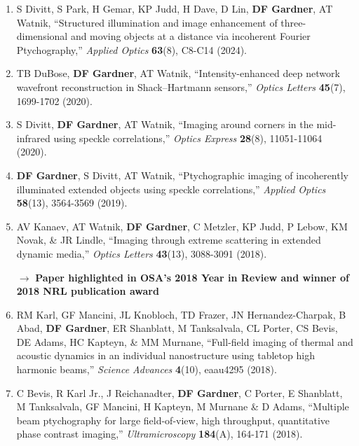 \documentclass[letterpaper,12pt]{article}
\begin{document}
\begin{enumerate}[leftmargin=*]
	
	\item S Divitt, S Park, H Gemar, KP Judd, H Dave, D Lin, \textbf{DF Gardner}, AT Watnik, ``Structured illumination and image enhancement of three-dimensional and moving objects at a distance via incoherent Fourier Ptychography,'' \emph{Applied Optics} \textbf{63}(8), C8-C14 (2024).
	
	\item TB DuBose, \textbf{DF Gardner}, AT Watnik, ``Intensity-enhanced deep network wavefront reconstruction in Shack–Hartmann sensors,'' \emph{Optics Letters} \textbf{45}(7), 1699-1702 (2020).

	\item S Divitt, \textbf{DF Gardner}, AT Watnik, ``Imaging around corners in the mid-infrared using speckle correlations,'' \emph{Optics Express} \textbf{28}(8), 11051-11064 (2020).

	\item \textbf{DF Gardner}, S Divitt, AT Watnik, ``Ptychographic imaging of incoherently illuminated extended objects using speckle correlations,'' \emph{Applied Optics} \textbf{58}(13), 3564-3569 (2019).
	
	\item AV Kanaev, AT Watnik, \textbf{DF Gardner}, C Metzler, KP Judd, P Lebow, KM Novak, \& JR Lindle, ``Imaging through extreme scattering in extended dynamic media,''  \emph{Optics Letters} \textbf{43}(13), 3088-3091 (2018).
	
	\quad $\rightarrow$ \textbf{Paper highlighted in OSA's 2018 Year in Review and winner of 2018 NRL publication award}
	
	\item RM Karl, GF Mancini, JL Knobloch, TD Frazer, JN Hernandez-Charpak, B Abad, \textbf{DF Gardner}, ER Shanblatt, M Tanksalvala, CL Porter, CS Bevis, DE Adams, HC Kapteyn, \& MM Murnane, ``Full-field imaging of thermal and acoustic dynamics in an individual nanostructure using tabletop high harmonic beams,'' \emph{Science Advances} \textbf{4}(10), eaau4295 (2018).
	
	\item  C Bevis, R Karl Jr., J Reichanadter, \textbf{DF Gardner}, C Porter, E Shanblatt, M Tanksalvala, GF Mancini, H Kapteyn, M Murnane \& D Adams, ``Multiple beam ptychography for large field-of-view, high throughput, quantitative phase contrast imaging,''  \emph{Ultramicroscopy} \textbf{184}(A), 164-171 (2018).
	

\end{enumerate}
\end{document}
